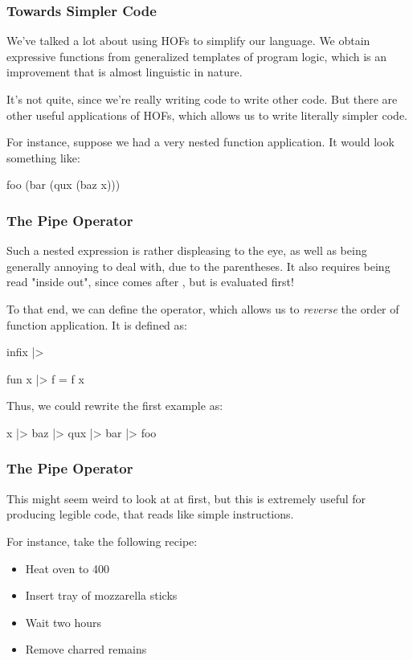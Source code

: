 \documentclass[aspectratio=169]{beamer}
\begin{document}

\begin{frame}[fragile]
  \frametitle{Towards Simpler Code}

  We've talked a lot about using HOFs to simplify our language. We obtain expressive 
  functions from generalized templates of program logic, which is an improvement that
  is almost linguistic in nature.

  It's not quite, since we're really writing code to write other code. But there are
  other useful applications of HOFs, which allows us to write literally simpler code.

  For instance, suppose we had a very nested function application. It would look
  something like:

  \begin{codeblock}
    foo (bar (qux (baz x)))
  \end{codeblock}
\end{frame}

\begin{frame}[fragile]
  \frametitle{The Pipe Operator}

  Such a nested expression is rather displeasing to the eye, as well as being 
  generally annoying to deal with, due to the parentheses. It also requires being
  read "inside out", since  comes after , but is evaluated first!

  To that end, we can define the \code{|>}\footnotemark operator, which allows us to
  \textit{reverse} the order of function application. It is defined as: 

  \begin{codeblock}
    infix |> 

    fun x |> f = f x 
  \end{codeblock}

  Thus, we could rewrite the first example as:

  \begin{codeblock}
    x |> baz |> qux |> bar |> foo
  \end{codeblock}

\end{frame}

\begin{frame}[fragile]
  \frametitle{The Pipe Operator}

  This might seem weird to look at at first, but this is extremely useful for
  producing legible code, that reads like simple instructions.

  For instance, take the following recipe:
  \begin{itemize}
    \item Heat oven to 400
    \item Insert tray of mozzarella sticks 
    \item Wait two hours
    \item Remove charred remains 
  \end{itemize}
\end{frame}
\end{document}
